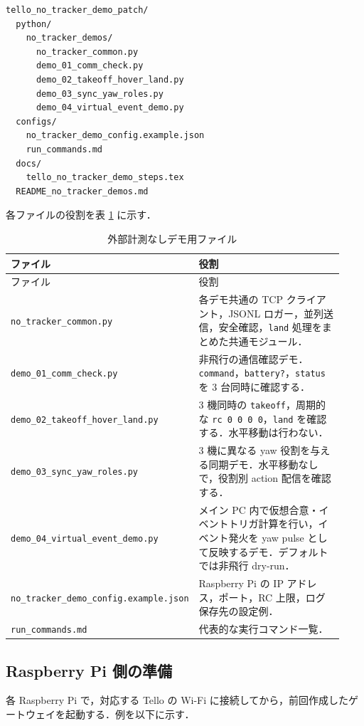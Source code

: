 \begin{lstlisting}
tello_no_tracker_demo_patch/
  python/
    no_tracker_demos/
      no_tracker_common.py
      demo_01_comm_check.py
      demo_02_takeoff_hover_land.py
      demo_03_sync_yaw_roles.py
      demo_04_virtual_event_demo.py
  configs/
    no_tracker_demo_config.example.json
    run_commands.md
  docs/
    tello_no_tracker_demo_steps.tex
  README_no_tracker_demos.md
\end{lstlisting}

各ファイルの役割を表 \ref{tab:demo_files} に示す．

\begin{longtable}{p{0.33\linewidth}p{0.60\linewidth}}
\caption{外部計測なしデモ用ファイル} \label{tab:demo_files} \\
\toprule
ファイル & 役割 \\
\midrule
\endfirsthead
\toprule
ファイル & 役割 \\
\midrule
\endhead
\texttt{no\_tracker\_common.py} & 各デモ共通の TCP クライアント，JSONL ロガー，並列送信，安全確認，\texttt{land} 処理をまとめた共通モジュール． \\
\texttt{demo\_01\_comm\_check.py} & 非飛行の通信確認デモ．\texttt{command}，\texttt{battery?}，\texttt{status} を 3 台同時に確認する． \\
\texttt{demo\_02\_takeoff\_hover\_land.py} & 3 機同時の \texttt{takeoff}，周期的な \texttt{rc 0 0 0 0}，\texttt{land} を確認する．水平移動は行わない． \\
\texttt{demo\_03\_sync\_yaw\_roles.py} & 3 機に異なる yaw 役割を与える同期デモ．水平移動なしで，役割別 action 配信を確認する． \\
\texttt{demo\_04\_virtual\_event\_demo.py} & メイン PC 内で仮想合意・イベントトリガ計算を行い，イベント発火を yaw pulse として反映するデモ．デフォルトでは非飛行 dry-run． \\
\texttt{no\_tracker\_demo\_config.example.json} & Raspberry Pi の IP アドレス，ポート，RC 上限，ログ保存先の設定例． \\
\texttt{run\_commands.md} & 代表的な実行コマンド一覧． \\
\bottomrule
\end{longtable}

\subsection{Raspberry Pi 側の準備}

各 Raspberry Pi で，対応する Tello の Wi-Fi に接続してから，前回作成したゲートウェイを起動する．例を以下に示す．

